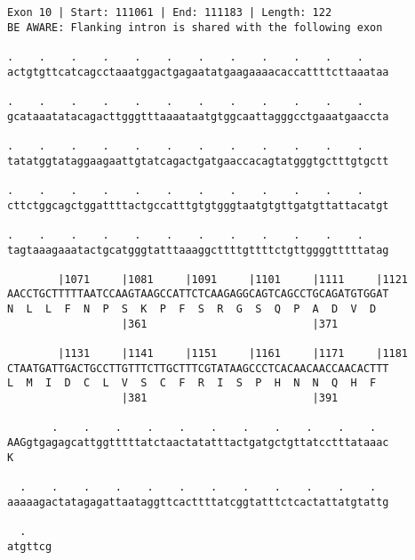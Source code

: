 \documentclass{article}
\begin{document}
\newpage
\begin{Verbatim}[fontfamily=courier]
Exon 10 | Start: 111061 | End: 111183 | Length: 122
BE AWARE: Flanking intron is shared with the following exon

.    .    .    .    .    .    .    .    .    .    .    .    
actgtgttcatcagcctaaatggactgagaatatgaagaaaacaccattttcttaaataa

.    .    .    .    .    .    .    .    .    .    .    .    
gcataaatatacagacttgggtttaaaataatgtggcaattagggcctgaaatgaaccta

.    .    .    .    .    .    .    .    .    .    .    .    
tatatggtataggaagaattgtatcagactgatgaaccacagtatgggtgctttgtgctt

.    .    .    .    .    .    .    .    .    .    .    .    
cttctggcagctggattttactgccatttgtgtgggtaatgtgttgatgttattacatgt

.    .    .    .    .    .    .    .    .    .    .    .    
tagtaaagaaatactgcatgggtatttaaaggcttttgttttctgttggggtttttatag

        |1071     |1081     |1091     |1101     |1111     |1121
AACCTGCTTTTTAATCCAAGTAAGCCATTCTCAAGAGGCAGTCAGCCTGCAGATGTGGAT
N  L  L  F  N  P  S  K  P  F  S  R  G  S  Q  P  A  D  V  D  
                  |361                          |371        

        |1131     |1141     |1151     |1161     |1171     |1181
CTAATGATTGACTGCCTTGTTTCTTGCTTTCGTATAAGCCCTCACAACAACCAACACTTT
L  M  I  D  C  L  V  S  C  F  R  I  S  P  H  N  N  Q  H  F  
                  |381                          |391        

       .    .    .    .    .    .    .    .    .    .    .  
AAGgtgagagcattggtttttatctaactatatttactgatgctgttatcctttataaac
K                                                           

  .    .    .    .    .    .    .    .    .    .    .    .  
aaaaagactatagagattaataggttcacttttatcggtatttctcactattatgtattg

  .    
atgttcg
\end{Verbatim}
\newpage
\end{document}
